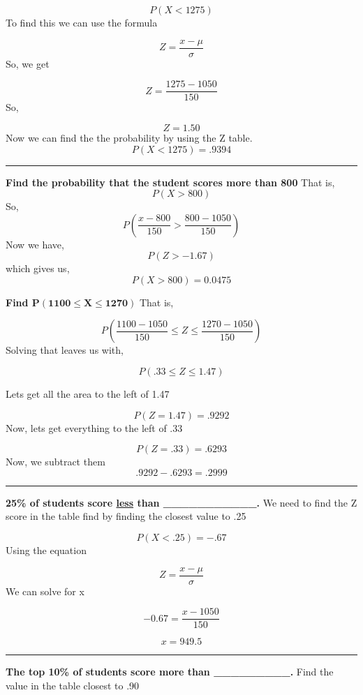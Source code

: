 \documentclass{report}
\begin{document}
    $$P(X<1275)$$
To find this we can use the formula

$$ Z = \dfrac{x - \mu}{\sigma}$$
So, we get

    $$ Z = \dfrac{1275 -1050}{150}$$
So,

    $$ Z = 1.50 $$
Now we can find the the probability by using the Z table.
\bigbreak \noindent
$$ P(X < 1275) = .9394$$
\bigbreak \noindent
%
%
%
    \bigbreak \noindent
    \hrule
    \bigbreak \noindent
    \textbf{Find the probability that the student scores more than 800}
    \bigbreak \noindent
    That is,
    $$P(X>800)$$
    So,
    $$ P(\frac{x - 800}{150} > \frac{800 - 1050}{150})$$
    Now we have,
    $$ P(Z > -1.67)$$
    which gives us,
    $$ P(X > 800) =  0.0475$$

  \pagebreak
\bigbreak \noindent
\textbf{Find $\mathbf{P(1100 \le X \le 1270)}$}
\bigbreak \noindent
That is,

$$P(\frac{1100 - 1050}{150} \le Z \le \frac{1270 - 1050}{150})$$
Solving that leaves us with,

$$ P(.33 \le Z \le 1.47)$$

\bigbreak \noindent Lets get all the area to the left of 1.47

$$ P(Z = 1.47) = .9292$$
\bigbreak \noindent 
Now, lets get everything to the left of .33

$$P(Z = .33) = .6293$$
\bigbreak \noindent
Now, we subtract them
$$ .9292 - .6293 = \boxed{.2999}$$
\bigbreak \noindent
\hrule
\bigbreak \noindent
\textbf{25\% of students score \underline{less} than \_\_\_\_\_\_\_\_\_\_\_.}
\bigbreak \noindent
We need to find the Z score in the table find by finding the closest value to .25

$$ P(X < .25) = -.67$$
Using the equation

$$ Z = \dfrac{x - \mu}{\sigma}$$
We can solve for x

$$ -0.67 = \frac{x - 1050}{150}$$

$$ x = 949.5$$
\bigbreak \noindent
\hrule
\bigbreak \noindent
\textbf{The top 10\% of students score more than \_\_\_\_\_\_\_\_\_. }
\bigbreak \noindent
Find the value in the table closest to .90
\end{document}
